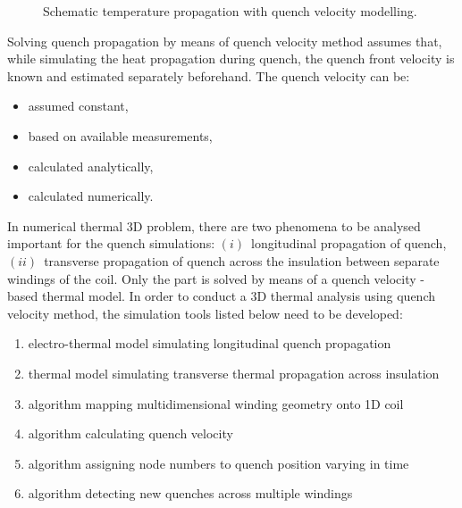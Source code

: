\documentclass{article}
\begin{document}
\begin{figure}[H]
\centering
{}
\caption{Schematic temperature propagation with quench velocity modelling.}
\label{fig:modelling_approach}
\end{figure}

Solving quench propagation by means of quench velocity method assumes that, while  simulating the heat propagation during quench, the quench front velocity is known and estimated separately beforehand. The quench velocity can be:
\begin{itemize}
\item assumed constant,
\item based on available measurements,
\item calculated analytically,
\item calculated numerically.
\end{itemize}

In numerical thermal 3D problem, there are two phenomena to be analysed important for the quench simulations: $(i)$~longitudinal propagation of quench, $(ii)$~transverse propagation of quench across the insulation between separate windings of the coil. Only the  part is solved by means of a quench velocity - based thermal model. In order to conduct a 3D thermal analysis using quench velocity method, the simulation tools listed below need to be developed: 
\begin{enumerate}
\item electro-thermal model simulating longitudinal quench propagation
\item thermal model simulating transverse thermal propagation across insulation
\item algorithm mapping multidimensional winding geometry onto 1D coil
\item algorithm calculating quench velocity
\item algorithm assigning node numbers to quench position varying in time
\item algorithm detecting new quenches across multiple windings
\end{enumerate}
\end{document}
